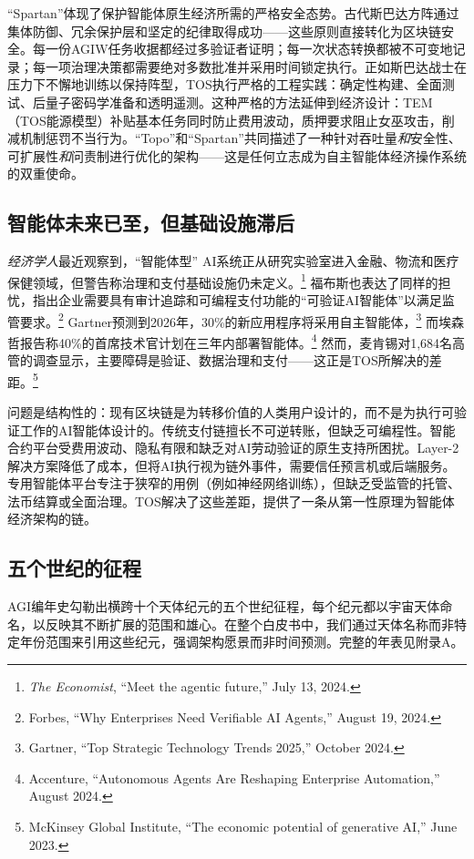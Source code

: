 \documentclass[11pt]{article}
\begin{document}
``Spartan''体现了保护智能体原生经济所需的严格安全态势。古代斯巴达方阵通过集体防御、冗余保护层和坚定的纪律取得成功——这些原则直接转化为区块链安全。每一份AGIW任务收据都经过多验证者证明；每一次状态转换都被不可变地记录；每一项治理决策都需要绝对多数批准并采用时间锁定执行。正如斯巴达战士在压力下不懈地训练以保持阵型，TOS执行严格的工程实践：确定性构建、全面测试、后量子密码学准备和透明遥测。这种严格的方法延伸到经济设计：TEM（TOS能源模型）补贴基本任务同时防止费用波动，质押要求阻止女巫攻击，削减机制惩罚不当行为。``Topo''和``Spartan''共同描述了一种针对吞吐量\emph{和}安全性、可扩展性\emph{和}问责制进行优化的架构——这是任何立志成为自主智能体经济操作系统的双重使命。

\subsection{智能体未来已至，但基础设施滞后}
\emph{经济学人}最近观察到，``智能体型'' AI系统正从研究实验室进入金融、物流和医疗保健领域，但警告称治理和支付基础设施仍未定义。\footnote{\emph{The Economist}, ``Meet the agentic future,'' July 13, 2024.} 福布斯也表达了同样的担忧，指出企业需要具有审计追踪和可编程支付功能的``可验证AI智能体''以满足监管要求。\footnote{Forbes, ``Why Enterprises Need Verifiable AI Agents,'' August 19, 2024.} Gartner预测到2026年，30\%的新应用程序将采用自主智能体，\footnote{Gartner, ``Top Strategic Technology Trends 2025,'' October 2024.} 而埃森哲报告称40\%的首席技术官计划在三年内部署智能体。\footnote{Accenture, ``Autonomous Agents Are Reshaping Enterprise Automation,'' August 2024.} 然而，麦肯锡对1,684名高管的调查显示，主要障碍是验证、数据治理和支付——这正是TOS所解决的差距。\footnote{McKinsey Global Institute, ``The economic potential of generative AI,'' June 2023.}

问题是结构性的：现有区块链是为转移价值的人类用户设计的，而不是为执行可验证工作的AI智能体设计的。传统支付链擅长不可逆转账，但缺乏可编程性。智能合约平台受费用波动、隐私有限和缺乏对AI劳动验证的原生支持所困扰。Layer-2解决方案降低了成本，但将AI执行视为链外事件，需要信任预言机或后端服务。专用智能体平台专注于狭窄的用例（例如神经网络训练），但缺乏受监管的托管、法币结算或全面治理。TOS解决了这些差距，提供了一条从第一性原理为智能体经济架构的链。

\subsection{五个世纪的征程}
AGI编年史勾勒出横跨十个天体纪元的五个世纪征程，每个纪元都以宇宙天体命名，以反映其不断扩展的范围和雄心。在整个白皮书中，我们通过天体名称而非特定年份范围来引用这些纪元，强调架构愿景而非时间预测。完整的年表见附录A。
\end{document}
